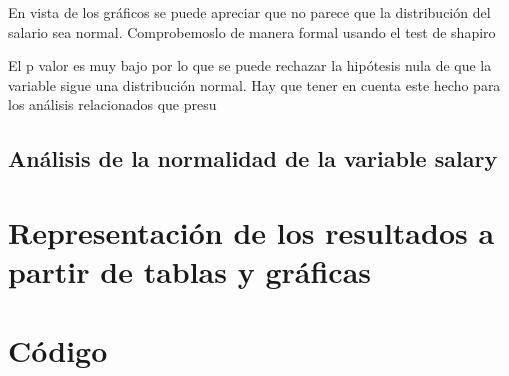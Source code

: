 \documentclass[
]{article}
\begin{document}
En vista de los gráficos se puede apreciar que no parece que la
distribución del salario sea normal. Comprobemoslo de manera formal
usando el test de shapiro

El p valor es muy bajo por lo que se puede rechazar la hipótesis nula de
que la variable sigue una distribución normal. Hay que tener en cuenta
este hecho para los análisis relacionados que presu

\hypertarget{anuxe1lisis-de-la-normalidad-de-la-variable-salary}{%
\subsection{Análisis de la normalidad de la variable
salary}\label{anuxe1lisis-de-la-normalidad-de-la-variable-salary}}

\hypertarget{representaciuxf3n-de-los-resultados-a-partir-de-tablas-y-gruxe1ficas}{%
\section{Representación de los resultados a partir de tablas y
gráficas}\label{representaciuxf3n-de-los-resultados-a-partir-de-tablas-y-gruxe1ficas}}

\hypertarget{cuxf3digo}{%
\section{Código}\label{cuxf3digo}}
\end{document}
